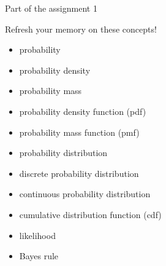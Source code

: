 \documentclass[english,t]{beamer}
\begin{document}
\begin{frame}{Part of the assignment 1}

  Refresh your memory on these concepts!
  \begin{itemize}
  \item[-] probability
  \item[-] probability density
  \item[-] probability mass
  \item[-] probability density function (pdf)
  \item[-] probability mass function (pmf)
  \item[-] probability distribution
  \item[-] discrete probability distribution
  \item[-] continuous probability distribution
  \item[-] cumulative distribution function (cdf)
  \item[-] likelihood
  \item[-] Bayes rule
  \end{itemize}
  
\end{frame}
\end{document}
